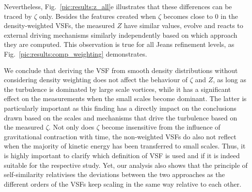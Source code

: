 Nevertheless, Fig.~\ref{pic:results:z_all}e illustrates that these differences can be traced by $\zeta$ only. 
Besides the features created when $\zeta$ becomes close to 0 in the density-weighted VSFs, the measured $Z$ have similar values, evolve and reacts to external driving mechanisms similarly independently based on which approach they are computed. 
This observation is true for all Jeans refinement levels, as Fig.~\ref{pic:results:comp_weighting} demonstrates.

We conclude that deriving the VSF from smooth density distributions without considering density weighting does not affect the behaviour of $\zeta$ and $Z$, as long as the turbulence is dominated by large scale vortices, while it has a significant effect on the measurements when the small scales become dominant.
The latter is particularly important as this finding has a directly impact on the conclusions drawn based on the scales and mechanisms that drive the turbulence based on the measured $\zeta$.
Not only does $\zeta$ become insensitive from the influence of gravitational contraction with time, the non-weighted VSFs do also not reflect when the majority of kinetic energy has been transferred to small scales. 
Thus, it is highly important to clarify which definition of VSF is used and if it is indeed suitable for the respective study.
Yet, our analysis also shows that the principle of self-similarity relativises the deviations between the two approaches as the different orders of the VSFs keep scaling in the same way relative to each other. 














